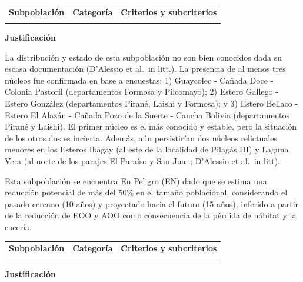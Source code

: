 \documentclass[
  x11names]{article}
\begin{document}
\begin{tabu} to 
\toprule
\textbf{Subpoblación} & \textbf{Categoría} & \textbf{Criterios y subcriterios}\\
\midrule
{} &  & \\
\bottomrule
\end{tabu}

\textbf{Justificación}

La distribución y estado de esta subpoblación no son bien conocidos dada
su escasa documentación (D'Alessio et al.~in litt.). La presencia de al
menos tres núcleos fue confirmada en base a encuestas: 1) Guaycolec -
Cañada Doce - Colonia Pastoril (departamentos Formosa y Pilcomayo); 2)
Estero Gallego - Estero González (departamentos Pirané, Laishi y
Formosa); y 3) Estero Bellaco - Estero El Alazán - Cañada Pozo de la
Suerte - Cancha Bolivia (departamentos Pirané y Laishi). El primer
núcleo es el más conocido y estable, pero la situación de los otros dos
es incierta. Además, aún persistirían dos núcleos relictuales menores en
los Esteros Ibagay (al este de la localidad de Pilagás III) y Laguna
Vera (al norte de los parajes El Paraíso y San Juan; D'Alessio et al.~in
litt).

Esta subpoblación se encuentra En Peligro (EN) dado que se estima una
reducción potencial de más del 50\% en el tamaño poblacional,
considerando el pasado cercano (10 años) y proyectado hacia el futuro
(15 años), inferido a partir de la reducción de EOO y AOO como
consecuencia de la pérdida de hábitat y la cacería.\vspace{0.5cm}

\begin{tabu} to 
\toprule
\textbf{Subpoblación} & \textbf{Categoría} & \textbf{Criterios y subcriterios}\\
\midrule
{} &  & \\
\bottomrule
\end{tabu}

\textbf{Justificación}
\end{document}
